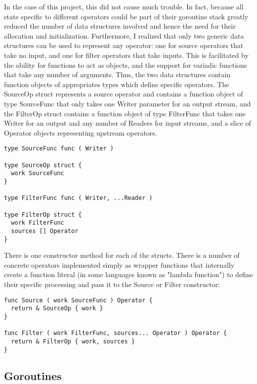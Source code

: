 \documentclass {article}
\begin{document}
In the case of this project, this did not cause much trouble. In fact, because
all state specific to different operators could be part of their goroutine stack
greatly reduced the number of data structures involved and hence the need for
their allocation and initialization. Furthermore, I realized that only two
generic data structures can be used to represent any operator: one for source
operators that take no input, and one for filter operators that take inputs.
This is facilitated by the ability for functions to act as objects, and the
support for variadic functions that take any number of arguments. Thus, the two
data structures contain function objects of appropriates types which define
specific operators. The SourceOp struct represents a source operator and
contains a function object of type SourceFunc that only takes one Writer
parameter for an output stream, and the FilterOp struct contains a function
object of type FilterFunc that takes one Writer for an output and any number of
Readers for input
streams, and a slice of Operator objects representing upstream operators.

\begin{lstlisting}
type SourceFunc func ( Writer )

type SourceOp struct {
  work SourceFunc
}

type FilterFunc func ( Writer, ...Reader )

type FilterOp struct {
  work FilterFunc
  sources [] Operator
}
\end{lstlisting}

There is one constructor method for each of the structs. There is a number of
concrete operators implemented simply as wrapper functions that internally
create a function literal (in some languages known as "lambda function") to
define their specific processing and pass it to the Source or Filter
constructor:

\begin{lstlisting}
func Source ( work SourceFunc ) Operator {
  return & SourceOp { work }
}

func Filter ( work FilterFunc, sources... Operator ) Operator {
  return & FilterOp { work, sources }
}
\end{lstlisting}


\subsection{Goroutines}
\end{document}
